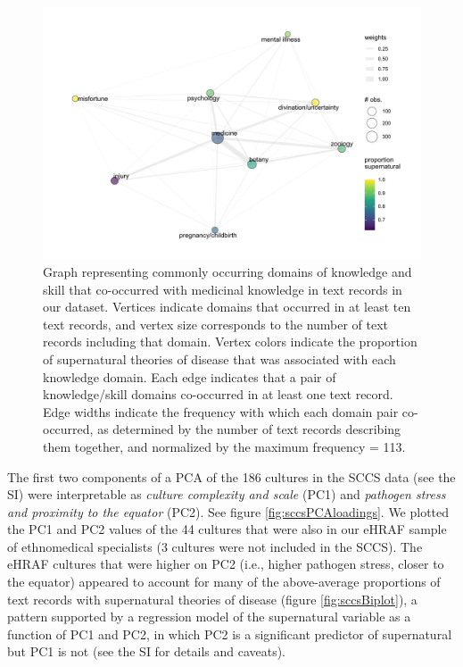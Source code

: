 \documentclass[
  11pt,
]{article}
\begin{document}
\begin{figure}[p]

{\centering \includegraphics{magic-healers-article2_files/figure-latex/ehrafdomainSupernaturalPlot-1} 

}

\caption{Graph representing commonly occurring domains of knowledge and skill that co-occurred with medicinal knowledge in text records in our dataset. Vertices indicate domains that occurred in at least ten text records, and vertex size corresponds to the number of text records including that domain. Vertex colors indicate the proportion of supernatural theories of disease that was associated with each knowledge domain. Each edge indicates that a pair of knowledge/skill domains co-occurred in at least one text record. Edge widths indicate the frequency with which each domain pair co-occurred, as determined by the number of text records describing them together, and normalized by the maximum frequency = 113.}\label{fig:ehrafdomainSupernaturalPlot}
\end{figure}

The first two components of a PCA of the 186 cultures in the SCCS data (see the SI) were interpretable as \emph{culture complexity and scale} (PC1) and \emph{pathogen stress and proximity to the equator} (PC2). See figure \ref{fig:sccsPCAloadings}. We plotted the PC1 and PC2 values of the 44 cultures that were also in our eHRAF sample of ethnomedical specialists (3 cultures were not included in the SCCS). The eHRAF cultures that were higher on PC2 (i.e., higher pathogen stress, closer to the equator) appeared to account for many of the above-average proportions of text records with supernatural theories of disease (figure \ref{fig:sccsBiplot}), a pattern supported by a regression model of the supernatural variable as a function of PC1 and PC2, in which PC2 is a significant predictor of supernatural but PC1 is not (see the SI for details and caveats).
\end{document}
